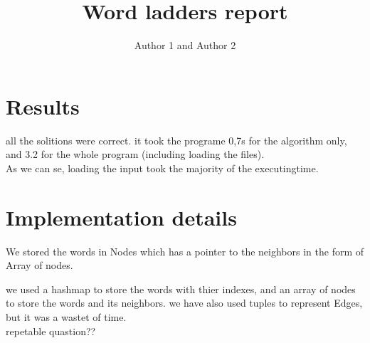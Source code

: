 \documentclass{article}
\title{Word ladders report}
\author{Author 1 and Author 2}
\begin{document}
  \maketitle

  \section{Results}

  \par

all the solitions were correct. it took the programe 0,7s for the algorithm only, and 3.2 for the whole program (including loading the files).\\
As we can se, loading the input took the majority of the executingtime.  

  \section{Implementation details}

  \par

We stored the words in Nodes which has a pointer to the neighbors in the form of Array of nodes.\par 
we used a hashmap to store the words with thier indexes, and an array of nodes to store the words and its neighbors.
we have also used tuples to represent Edges, but it was a wastet of time.\\
repetable quastion?? 
\end{document}
